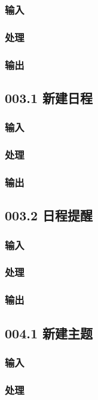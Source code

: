     \subsubsection{输入}
    \subsubsection{处理}
    \subsubsection{输出}

  \subsection{003.1 新建日程}
    \subsubsection{输入}
    \subsubsection{处理}
    \subsubsection{输出}

  \subsection{003.2 日程提醒}
    \subsubsection{输入}
    \subsubsection{处理}
    \subsubsection{输出}

  \subsection{004.1 新建主题}
    \subsubsection{输入}
    \subsubsection{处理}
